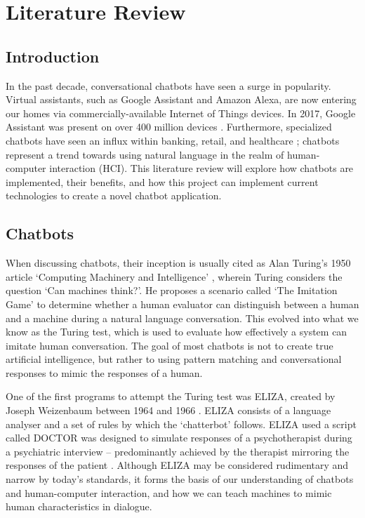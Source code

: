 \chapter{Literature Review}
\label{ch:lit}
\section{Introduction}
In the past decade, conversational chatbots have seen a surge in popularity. Virtual assistants, such as Google Assistant and Amazon Alexa, are now entering our homes via commercially-available Internet of Things devices. In 2017, Google Assistant was present on over 400 million devices \cite{chandra2018}. Furthermore, specialized chatbots have seen an influx within banking, retail, and healthcare \cite{gvr2017}; chatbots represent a trend towards using natural language in the realm of human-computer interaction (HCI).  This literature review will explore how chatbots are implemented, their benefits, and how this project can implement current technologies to create a novel chatbot application.

\section{Chatbots}
When discussing chatbots, their inception is usually cited as Alan Turing’s 1950 article `Computing Machinery and Intelligence' \cite{turing1950computing}, wherein Turing considers the question `Can machines think?'. He proposes a scenario called `The Imitation Game' to determine whether a human evaluator can distinguish between a human and a machine during a natural language conversation. This evolved into what we know as the Turing test, which is used to evaluate how effectively a system can imitate human conversation. The goal of most chatbots is not to create true artificial intelligence, but rather to using pattern matching and conversational responses to mimic the responses of a human.

One of the first programs to attempt the Turing test was ELIZA, created by Joseph Weizenbaum between 1964 and 1966 \cite{weizenbaum1976computer}. ELIZA consists of a language analyser and a set of rules by which the `chatterbot' follows. ELIZA used a script called DOCTOR was designed to simulate responses of a psychotherapist during a psychiatric interview – predominantly achieved by the therapist mirroring the responses of the patient  \cite{weizenbaum1976computer}. Although ELIZA may be considered rudimentary and narrow by today’s standards, it forms the basis of our understanding of chatbots and human-computer interaction, and how we can teach machines to mimic human characteristics in dialogue.

